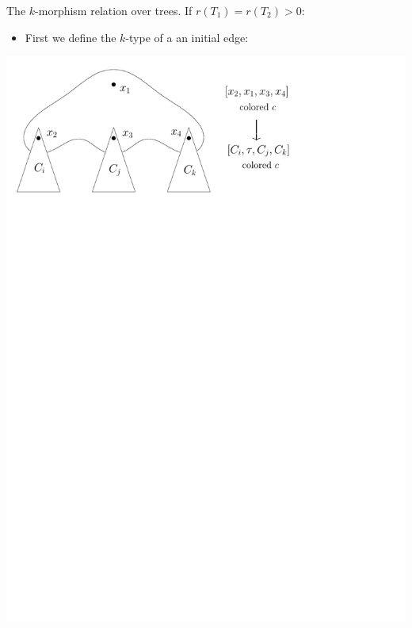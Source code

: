 \documentclass[11pt]{beamer}
\begin{document}
	\begin{frame}{The $k$-morphism relation over trees.}
		If $r(T_1)=r(T_2)>0$:
			\begin{itemize}
				\item  First we
				define the $k$-type of a an initial edge:
				
			\end{itemize}
		\begin{center}
			\includegraphics[width=0.8\linewidth]{Edgetype.pdf}
		\end{center}
	\end{frame}
\end{document}
